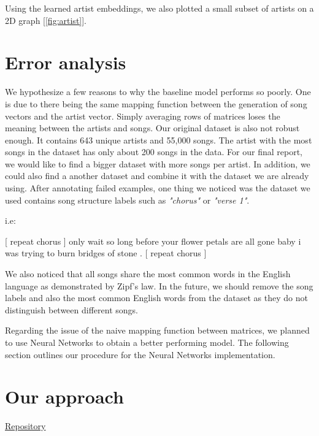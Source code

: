 \documentclass[11pt,a4paper]{article}
\begin{document}
Using the learned artist embeddings, we also plotted a small subset of artists on a 2D graph [\ref{fig:artist}].


    
    \section{Error analysis}


We hypothesize a few reasons to why the baseline model performs so poorly. One is due to there being the same mapping function between the generation of song vectors and the artist vector. Simply averaging rows of matrices loses the meaning between the artists and songs. Our original dataset is also not robust enough. It contains 643 unique artists and 55,000 songs. 
The artist with the most songs in the dataset has only about 200 songs in the data. For our final report, we would like to find a bigger dataset with more songs per artist. In addition, we could also find a another dataset and combine it with the dataset we are already using. After annotating failed examples, one thing we noticed was the dataset we used contains song structure labels such as \textit{"chorus"} or \textit{"verse 1"}.

i.e:


\begin{center}
[ repeat chorus ] 
only wait so long before your flower petals are all 
gone baby i was trying to burn bridges of stone 
. [ repeat chorus ]
\end{center}







We also noticed that all songs share the most common words in the English language as demonstrated by Zipf’s law. In the future, we should remove the song labels and also the most common English words from the dataset as they do not distinguish between different songs. 

Regarding the issue of the naive mapping function between matrices, we planned to use Neural Networks to obtain a better performing model. The following section outlines our procedure for the Neural Networks implementation.
    
    \section{Our approach}

\begin{center}
 \href{https://github.com/onocy/nlp_f18/tree/rnn_pandas}{Repository}
\end{center}
\end{document}
